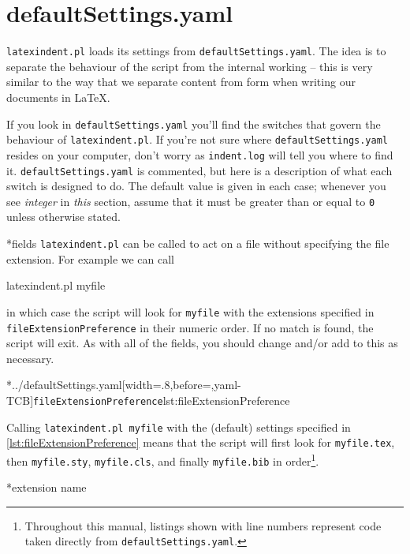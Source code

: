 \section{defaultSettings.yaml}\label{sec:defuseloc}
 \texttt{latexindent.pl} loads its settings from \texttt{defaultSettings.yaml}. The idea is to
 separate the behaviour of the script from the internal working -- this is very similar to
 the way that we separate content from form when writing our documents in \LaTeX.

 If you look in \texttt{defaultSettings.yaml} you'll find the switches that govern the behaviour
 of \texttt{latexindent.pl}. If you're not sure where \texttt{defaultSettings.yaml} resides on
 your computer, don't worry as \texttt{indent.log} will tell you where to find it.
 \texttt{defaultSettings.yaml} is commented, but here is a description of what each switch is
 designed to do. The default value is given in each case; whenever you see
 \emph{integer} in \emph{this} section, assume that it must be
 greater than or equal to \texttt{0} unless otherwise stated.

*{fields}
	\texttt{latexindent.pl} can be called to
	act on a file without specifying the file extension.  For example we can call
	\begin{commandshell}
latexindent.pl myfile
\end{commandshell}
	in which case the script will look for \texttt{myfile} with the extensions
	specified in \texttt{fileExtensionPreference} in their numeric order. If no match is found, the
	script will exit. As with all of the fields, you should change and/or add to this as
	necessary.

	\cmhlistingsfromfile[style=fileExtensionPreference]*{../defaultSettings.yaml}[width=.8\linewidth,before=\centering,yaml-TCB]{\texttt{fileExtensionPreference}}{lst:fileExtensionPreference}

	Calling \texttt{latexindent.pl myfile} with the (default) settings specified in
	\cref{lst:fileExtensionPreference} means that the script will first look for
	\texttt{myfile.tex}, then \texttt{myfile.sty}, \texttt{myfile.cls}, and
	finally \texttt{myfile.bib} in order\footnote{Throughout this manual, listings shown with line numbers represent code
		taken directly from \texttt{defaultSettings.yaml}.}.


*{extension name}

